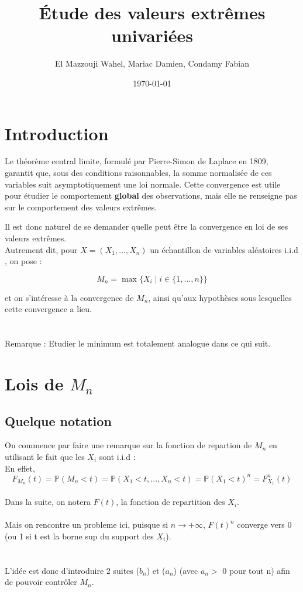 \documentclass{article}
\title{Étude des valeurs extrêmes univariées}
\author{El Mazzouji Wahel, Mariac Damien, Condamy Fabian}
\date{\today}
\begin{document}
\maketitle 
\newpage
\tableofcontents 
\newpage
\section{Introduction} 

Le théorème central limite, formulé par Pierre-Simon de Laplace en 1809, garantit que, sous des conditions raisonnables, la somme normalisée de ces variables suit asymptotiquement une loi normale. Cette convergence est utile pour étudier le comportement \textbf{global} des observations, mais elle ne renseigne pas sur le comportement des valeurs extrêmes.

Il est donc naturel de se demander quelle peut être la convergence en loi de ses valeurs extrêmes. 
\\
Autrement dit, pour \( X = (X_1, ..., X_n) \) un échantillon de variables aléatoires i.i.d , on pose :


\[
M_n = \max\{X_i \mid i \in \{1, ..., n\} \}
\]

et on s'intéresse à la convergence de \( M_n \), ainsi qu'aux hypothèses sous lesquelles cette convergence a lieu.
\\
\\
\\
Remarque : Etudier le minimum est totalement analogue dans ce qui suit.

\section{Lois de $M_n$}

\subsection{Quelque notation }

On commence par faire une remarque sur la fonction de repartion de $M_n$ en utilisant le fait que les $X_i$ sont i.i.d :
\\
En effet,
\[
F_{M_n}(t) = \mathbb{P}(M_n < t) = \mathbb{P}(X_1 < t,...,X_n <t)=\mathbb{P}(X_1<t)^n = F_{X_1}^n(t) 
\]
\\
Dans la suite, on notera $F(t)$, la fonction de repartition des $X_i$.
\\
\\
Mais on rencontre un probleme ici, puisque si $n\to + \infty$, $F(t)^n$ converge vers 0 (ou 1 si t est la borne sup du support des $X_i$).
\\
\\
\\
L'idée est donc d'introduire 2 suites ($b_n$) et ($a_n$) (avec $a_n > $  0 pour tout n) afin de pouvoir contrôler $M_n$.
\end{document}
